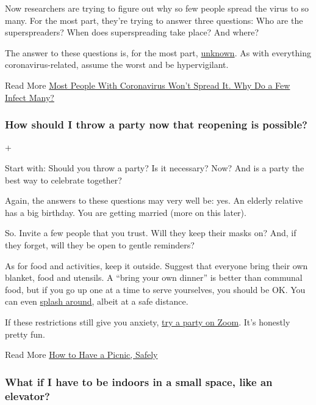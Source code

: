 Now researchers are trying to figure out why so few people spread the
virus to so many. For the most part, they're trying to answer three
questions: Who are the superspreaders? When does superspreading take
place? And where?

The answer to these questions is, for the most part,
\href{https://www.nytimes.com/2020/06/30/science/how-coronavirus-spreads.html}{unknown}.
As with everything coronavirus-related, assume the worst and be
hypervigilant.

 Read More
\href{https://www.nytimes.com/2020/06/30/science/how-coronavirus-spreads.html}{Most
People With Coronavirus Won't Spread It. Why Do a Few Infect Many?}

\hypertarget{how-should-i-throw-a-party-now-that-reopening-is-possible}{%
\subsubsection{How should I throw a party now that reopening is
possible?}\label{how-should-i-throw-a-party-now-that-reopening-is-possible}}

+

Start with: Should you throw a party? Is it necessary? Now? And is a
party the best way to celebrate together?

Again, the answers to these questions may very well be: yes. An elderly
relative has a big birthday. You are getting married (more on this
later).

So. Invite a few people that you trust. Will they keep their masks on?
And, if they forget, will they be open to gentle reminders?

As for food and activities, keep it outside. Suggest that everyone bring
their own blanket, food and utensils. A ``bring your own dinner'' is
better than communal food, but if you go up one at a time to serve
yourselves, you should be OK. You can even
\href{https://www.nytimes.com/2020/06/06/at-home/coronavirus-cool-off-even-without-a-deep-end.html}{splash
around}, albeit at a safe distance.

If these restrictions still give you anxiety,
\href{https://www.nytimes.com/2020/05/02/smarter-living/zoom-birthday-party.html}{try
a party on Zoom}. It's honestly pretty fun.

 Read More
\href{https://www.nytimes.com/2020/05/09/dining/coronavirus-how-to-have-a-picnic-safely.html}{How
to Have a Picnic, Safely}

\hypertarget{what-if-i-have-to-be-indoors-in-a-small-space-like-an-elevator}{%
\subsubsection{What if I have to be indoors in a small space, like an
elevator?}\label{what-if-i-have-to-be-indoors-in-a-small-space-like-an-elevator}}

